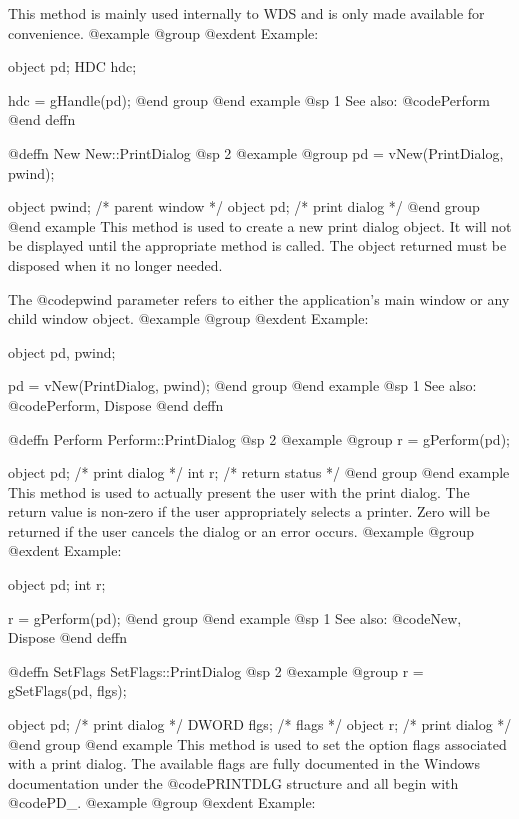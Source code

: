 This method is mainly used internally to WDS and is only made available
for convenience.
@example
@group
@exdent Example:

object  pd;
HDC     hdc;

hdc = gHandle(pd);
@end group
@end example
@sp 1
See also:  @code{Perform}
@end deffn









@deffn {New} New::PrintDialog
@sp 2
@example
@group
pd = vNew(PrintDialog, pwind);

object  pwind;  /*  parent window  */
object  pd;     /*  print dialog   */
@end group
@end example
This method is used to create a new print dialog object.  It will not be
displayed until the appropriate method is called.  The object returned
must be disposed when it no longer needed.

The @code{pwind} parameter refers to either the application's main window
or any child window object.
@example
@group
@exdent Example:

object  pd, pwind;

pd = vNew(PrintDialog, pwind);
@end group
@end example
@sp 1
See also:  @code{Perform, Dispose}
@end deffn












@deffn {Perform} Perform::PrintDialog
@sp 2
@example
@group
r = gPerform(pd);

object  pd;     /*  print dialog   */
int     r;      /*  return status  */
@end group
@end example
This method is used to actually present the user with the print dialog.
The return value is non-zero if the user appropriately selects a printer.
Zero will be returned if the user cancels the dialog or an error occurs.
@example
@group
@exdent Example:

object  pd;
int     r;

r = gPerform(pd);
@end group
@end example
@sp 1
See also:  @code{New, Dispose}
@end deffn







@deffn {SetFlags} SetFlags::PrintDialog
@sp 2
@example
@group
r = gSetFlags(pd, flgs);

object  pd;     /*  print dialog  */
DWORD   flgs;   /*  flags         */
object  r;      /*  print dialog  */
@end group
@end example
This method is used to set the option flags associated with a print dialog.
The available flags are fully documented in the Windows documentation
under the @code{PRINTDLG} structure and all begin with @code{PD_}.
@example
@group
@exdent Example:

